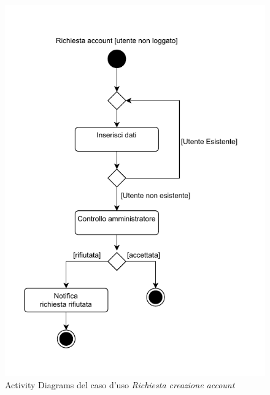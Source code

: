\documentclass[a4paper]{article}
\begin{document}
\begin{figure}[H]
    \centering
    \includegraphics{./figures/account_request_ac}
    \caption{Activity Diagrams del caso d'uso \textit{Richiesta creazione account}}
    \label{fig:ac_account_request}
\end{figure}
\end{document}
